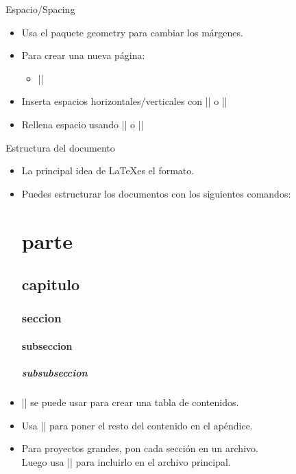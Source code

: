 \begin{frame}[fragile]{Espacio/Spacing}
  \begin{itemize}
    \item Usa el paquete geometry para cambiar los márgenes.
          \begin{latexcode}
            \usepackage[top=3cm,bottom=3cm,left=2.5cm,right=2.5cm]{geometry}
          \end{latexcode}
    \item Para crear una nueva página:
          \begin{itemize}
            \item \latexinline|\newpage|
          \end{itemize}
    \item Inserta espacios horizontales/verticales con \latexinline|\hspace{1em}| o \latexinline|\vspace{1ex}|
    \item Rellena espacio usando \latexinline|\hfill| o \latexinline|\vfill|
  \end{itemize}
\end{frame}


\begin{frame}[fragile]{Estructura del documento}
  \begin{itemize}
    \item La principal idea de \LaTeX  es el formato.
    \item Puedes estructurar los documentos con los siguientes comandos:
          \begin{latexcode}
            \part{parte} %
            \chapter{capitulo} %
            \section{seccion}
            \subsection{subseccion}
            \subsubsection{subsubseccion}
          \end{latexcode}
    \item \latexinline|\tableofcontents| se puede usar para crear una tabla de contenidos.
    \item Usa \latexinline|\appendix| para poner el resto del contenido en el apéndice.
    \item Para proyectos grandes, pon cada sección en un archivo. \\
          Luego usa \latexinline|| para incluirlo en el archivo principal.
  \end{itemize}
\end{frame}

